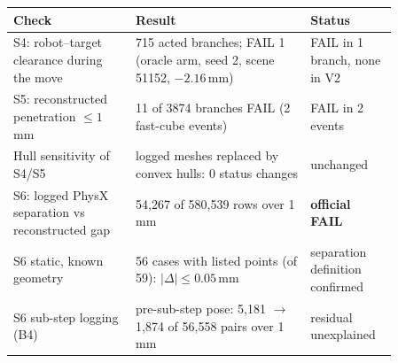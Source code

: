 \begin{tabular}{p{0.28\linewidth}p{0.40\linewidth}p{0.18\linewidth}}
\toprule
Check & Result & Status\\
\midrule
S4: robot--target clearance during the move & 715 acted branches; FAIL 1 (oracle arm, seed 2, scene 51152, $-2.16$\,mm) & FAIL in 1 branch, none in V2\\
S5: reconstructed penetration $\le 1$\,mm & 11 of 3874 branches FAIL (2 fast-cube events) & FAIL in 2 events\\
Hull sensitivity of S4/S5 & logged meshes replaced by convex hulls: 0 status changes & unchanged\\
S6: logged PhysX separation vs reconstructed gap & 54,267 of 580,539 rows over 1\,mm & \textbf{official FAIL}\\
S6 static, known geometry & 56 cases with listed points (of 59): $|\Delta| \le 0.05$\,mm & separation definition confirmed\\
S6 sub-step logging (B4) & pre-sub-step pose: 5,181 $\to$ 1,874 of 56,558 pairs over 1\,mm & residual unexplained\\
\bottomrule
\end{tabular}

